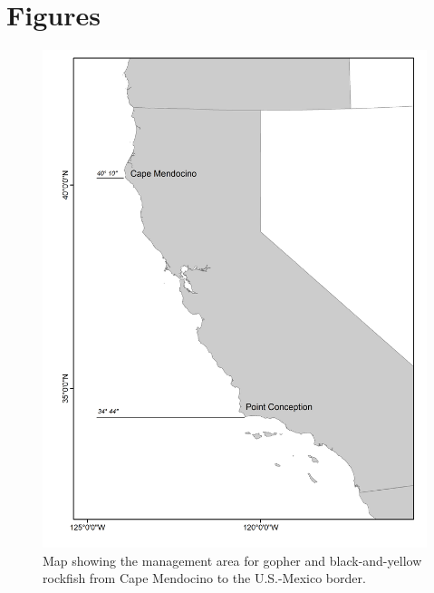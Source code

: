 \documentclass[12pt,]{article}
\begin{document}
\FloatBarrier

\FloatBarrier

\newpage

\section{Figures}\label{figures}

\begin{figure}
\centering
\includegraphics{Figures/assess_region_map.png}
\caption{Map showing the management area for gopher and black-and-yellow
rockfish from Cape Mendocino to the U.S.-Mexico border.
\label{fig:assess_region_map1}}
\end{figure}
\end{document}
